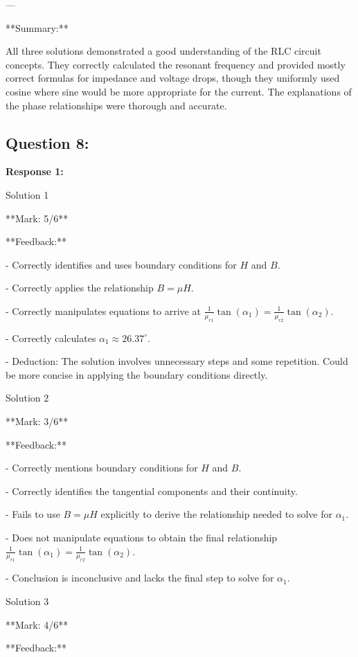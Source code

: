 \documentclass[a4paper,11pt]{article}
\begin{document}
---

**Summary:**

All three solutions demonstrated a good understanding of the RLC circuit concepts. They correctly calculated the resonant frequency and provided mostly correct formulas for impedance and voltage drops, though they uniformly used cosine where sine would be more appropriate for the current. The explanations of the phase relationships were thorough and accurate.

\subsection*{Question 8:}

\textbf{Response 1:}

Solution 1

**Mark: 5/6**

**Feedback:**

- Correctly identifies and uses boundary conditions for \(H\) and \(B\).

- Correctly applies the relationship \(B = \mu H\).

- Correctly manipulates equations to arrive at \(\frac{1}{\mu_{r1}} \tan(\alpha_{1}) = \frac{1}{\mu_{r2}} \tan(\alpha_{2})\).

- Correctly calculates \(\alpha_{1} \approx 26.37^\circ\).

- Deduction: The solution involves unnecessary steps and some repetition. Could be more concise in applying the boundary conditions directly.

Solution 2

**Mark: 3/6**

**Feedback:**

- Correctly mentions boundary conditions for \(H\) and \(B\).

- Correctly identifies the tangential components and their continuity.

- Fails to use \(B = \mu H\) explicitly to derive the relationship needed to solve for \(\alpha_{1}\).

- Does not manipulate equations to obtain the final relationship \(\frac{1}{\mu_{r1}} \tan(\alpha_{1}) = \frac{1}{\mu_{r2}} \tan(\alpha_{2})\).

- Conclusion is inconclusive and lacks the final step to solve for \(\alpha_{1}\).

Solution 3

**Mark: 4/6**

**Feedback:**
\end{document}
